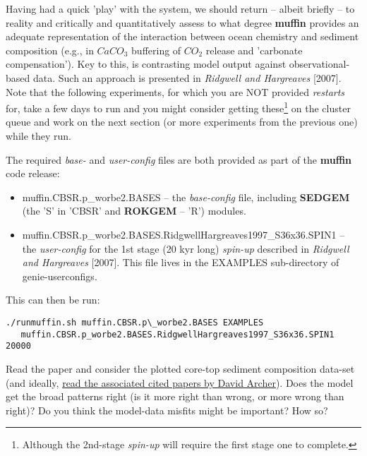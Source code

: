 Having had a quick 'play' with the system, we should return -- albeit briefly -- to reality and critically and quantitatively assess to what degree \textbf{muffin}  provides an adequate representation of the interaction between ocean chemistry and sediment composition (e.g., in \(CaCO_{3}\) buffering of \(CO_{2}\) release and 'carbonate compensation'). Key to this, is contrasting  model output against observational-based data. Such an approach is presented in \textit{Ridgwell and Hargreaves} [2007]. Note that the following experiments, for which you are NOT provided \textit{restarts} for, take a few days to run and you might consider getting these\footnote{Although the 2nd-stage \textit{spin-up} will require the first stage one to complete.} on the cluster queue and work on the next section (or more experiments from the previous one) while they run.

\vspace{1mm}
The required \textit{base-} and \textit{user-config} files are both provided as part of the \textbf{muffin} code release:

\begin{itemize}[noitemsep]
\vspace{1mm}
\item \textsf{\footnotesize muffin.CBSR.p\_worbe2.BASES} -- the \textit{base-config} file, including \textbf{SEDGEM} (the '\textsf{\footnotesize S}' in '\textsf{\footnotesize CBSR}' and \textbf{ROKGEM} -- '\textsf{\footnotesize R}') modules.
\vspace{1mm}
\item \textsf{\footnotesize muffin.CBSR.p\_worbe2.BASES.RidgwellHargreaves1997\_S36x36.SPIN1} -- the \textit{user-config} for the 1st stage (20 kyr long) \textit{spin-up} described in \textit{Ridgwell and Hargreaves} [2007]. This file lives in the \textsf{\footnotesize EXAMPLES} sub-directory of \textsf{\footnotesize genie-userconfigs}.
\end{itemize}

This can then be run:
\vspace{-1mm}\small\begin{verbatim}
./runmuffin.sh muffin.CBSR.p\_worbe2.BASES EXAMPLES
   muffin.CBSR.p_worbe2.BASES.RidgwellHargreaves1997_S36x36.SPIN1 20000
\end{verbatim}\normalsize\vspace{-1mm}

Read the paper and consider the plotted core-top sediment composition data-set (and ideally, \uline{read the associated cited papers by David Archer}). Does the model get the broad patterns right (is it more right than wrong, or more wrong than right)? Do you think the model-data misfits might be important? How so?

